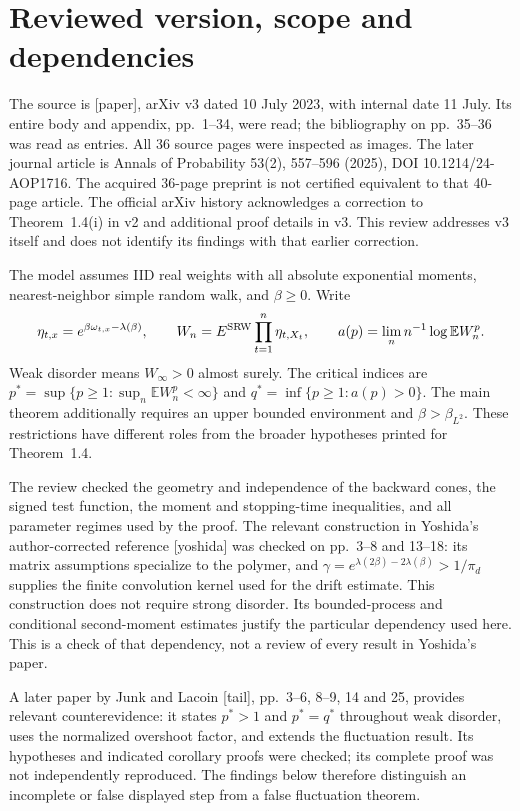 \documentclass[10pt]{article}
\begin{document}
\section*{Reviewed version, scope and dependencies}
The source is [paper], arXiv v3 dated 10 July 2023, with internal date 11 July. Its entire body and appendix, pp. 1–34, were read; the bibliography on pp. 35–36 was read as entries. All 36 source pages were inspected as images. The later journal article is Annals of Probability 53(2), 557–596 (2025), DOI 10.1214/24-AOP1716. The acquired 36-page preprint is not certified equivalent to that 40-page article. The official arXiv history acknowledges a correction to Theorem 1.4(i) in v2 and additional proof details in v3. This review addresses v3 itself and does not identify its findings with that earlier correction.\par
The model assumes IID real weights with all absolute exponential moments, nearest-neighbor simple random walk, and \(\beta\geq0\). Write \[\eta_{t,x}=e^{\beta\omega_{t,x}-\lambda(\beta)},\qquad
 W_n=E^{\rm SRW}\prod_{t=1}^n\eta_{t,X_t},\qquad
 a(p)=\lim_n n^{-1}\log\mathbb E W_n^p .\] Weak disorder means \(W_\infty>0\) almost surely. The critical indices are \(p^*=\sup\{p\geq1:\sup_n\mathbb E W_n^p<\infty\}\) and \(q^*=\inf\{p\geq1:a(p)>0\}\). The main theorem additionally requires an upper bounded environment and \(\beta>\beta_{L^2}\). These restrictions have different roles from the broader hypotheses printed for Theorem 1.4.\par
The review checked the geometry and independence of the backward cones, the signed test function, the moment and stopping-time inequalities, and all parameter regimes used by the proof. The relevant construction in Yoshida’s author-corrected reference [yoshida] was checked on pp. 3–8 and 13–18: its matrix assumptions specialize to the polymer, and \(\gamma=e^{\lambda(2\beta)-2\lambda(\beta)}>1/\pi_d\) supplies the finite convolution kernel used for the drift estimate. This construction does not require strong disorder. Its bounded-process and conditional second-moment estimates justify the particular dependency used here. This is a check of that dependency, not a review of every result in Yoshida’s paper.\par
A later paper by Junk and Lacoin [tail], pp. 3–6, 8–9, 14 and 25, provides relevant counterevidence: it states \(p^*>1\) and \(p^*=q^*\) throughout weak disorder, uses the normalized overshoot factor, and extends the fluctuation result. Its hypotheses and indicated corollary proofs were checked; its complete proof was not independently reproduced. The findings below therefore distinguish an incomplete or false displayed step from a false fluctuation theorem.\par
\end{document}
